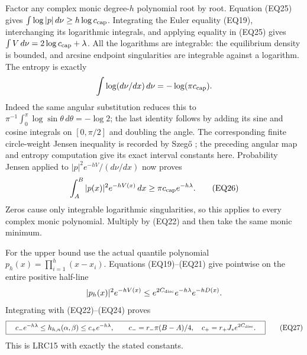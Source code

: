 \documentclass[11pt,a4paper]{article}
\begin{document}
Factor any complex monic degree-\(h\) polynomial root by root.
Equation (EQ25) gives \(\int\log|p|\,d\nu\ge h\log c_{\rm cap}\).
Integrating the Euler equality (EQ19), interchanging its logarithmic
integrals, and applying equality in (EQ25) gives
\(\int V\,d\nu=2\log c_{\rm cap}+\lambda\).
All the logarithms are integrable: the equilibrium density is bounded,
and arcsine endpoint singularities are integrable against a logarithm.
The entropy is exactly
\[
 \int\log(d\nu/dx)\,d\nu=-\log(\pi c_{\rm cap}).
\]
Indeed the same angular substitution reduces this to
\(\pi^{-1}\int_0^\pi\log\sin\theta\,d\theta=-\log2\);
the last identity follows by adding its sine and cosine integrals
on \([0,\pi/2]\) and doubling the angle.
The corresponding finite circle-weight Jensen inequality is recorded by
Szeg\H{o} \cite[\S12.3, eq.~(12.3.4), pp.~300--301]{human:szego1975};
the preceding angular map and entropy computation give its exact
interval constants here.  Probability Jensen applied to
\(|p|^2e^{-hV}/(d\nu/dx)\) now proves
\[
 \int_A^B|p(x)|^2e^{-hV(x)}\,dx
 \ge \pi c_{\rm cap} e^{-h\lambda}.
\tag{EQ26}
\]
Zeros cause only integrable logarithmic singularities, so this applies
to every complex monic polynomial.  Multiply by (EQ22) and then
take the same monic minimum.

For the upper bound use the actual quantile polynomial
\(p_h(x)=\prod_{i=1}^h(x-x_i)\).  Equations (EQ19)--(EQ21) give pointwise
on the entire positive half-line
\[
 |p_h(x)|^2e^{-hV(x)}
 \le e^{2C_{\rm disc}}e^{-h\lambda}e^{-hD(x)}.
\]
Integrating with (EQ22)--(EQ24) proves
\[
 \boxed{\quad
 c_-e^{-h\lambda}\le h_{h,n}(\alpha,\beta)
                \le c_+e^{-h\lambda},\qquad
 c_-=r_-\pi(B-A)/4,\quad
 c_+=r_+J_*e^{2C_{\rm disc}}.\quad}
\tag{EQ27}
\]
This is LRC15 with exactly the stated constants.
\end{document}

